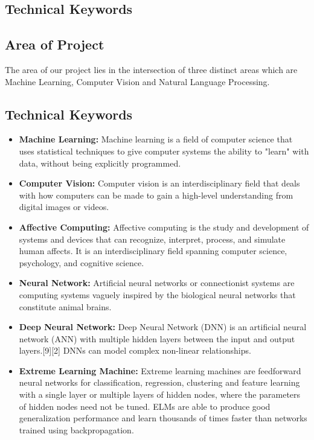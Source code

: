 \documentclass[oneside,a4paper,12pt]{report}
\begin{document}
\begin{normalsize}
\chapter{Technical Keywords}

\section{Area of Project}
\begin{center}
	The area of our project lies in the intersection of three distinct areas which are Machine Learning, Computer Vision and Natural Language Processing.
\end{center}

\section{Technical Keywords}

 \begin{itemize}
   \item 	\textbf{Machine Learning: } Machine learning is a field of computer science that uses statistical techniques to give computer systems the ability to "learn" with data, without being explicitly programmed.
 \item \textbf{Computer Vision: } Computer vision is an interdisciplinary field that deals with how computers can be made to gain a high-level understanding from digital images or videos.
 \item	\textbf{Affective Computing: } Affective computing is the study and development of systems and devices that can recognize, interpret, process, and simulate human affects. It is an interdisciplinary field spanning computer science, psychology, and cognitive science.
 \item \textbf{Neural Network: } Artificial neural networks or connectionist systems are computing systems vaguely inspired by the biological neural networks that constitute animal brains.
 
 \item \textbf{Deep Neural Network: } Deep Neural Network (DNN) is an artificial neural network (ANN) with multiple hidden layers between the input and output layers.[9][2] DNNs can model complex non-linear relationships.
 
 \item \textbf{Extreme Learning Machine: } Extreme learning machines are feedforward neural networks for classification, regression, clustering and feature learning with a single layer or multiple layers of hidden nodes, where the parameters of hidden nodes need not be tuned. ELMs are able to produce good generalization performance and learn thousands of times faster than networks trained using backpropagation.
 

\end{itemize}
\end{normalsize}
\end{document}

